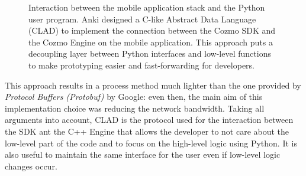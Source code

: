 \begin{figure}
{
	}
	\caption[Interaction Application/PC]{Interaction between the mobile application stack and the Python user program. Anki designed a C-like Abstract Data Language (CLAD) to implement the connection between the Cozmo SDK and the Cozmo Engine on the mobile application. This approach puts a decoupling layer between Python interfaces and low-level functions to make prototyping easier and fast-forwarding for developers. \cite{mellon2017cognitive}}
	\label{fig:cozmotear2}
\end{figure}

This approach results in a process method much lighter than the one provided by \textit{Protocol Buffers (Protobuf)} by Google: even then, the main aim of this implementation choice was reducing the network bandwidth.
Taking all arguments into account, CLAD is the protocol used for the interaction between the SDK ant the C++ Engine that allows the developer to not care about the low-level part of the code and to focus on the high-level logic using Python. It is also useful to maintain the same interface for the user even if low-level logic changes occur.

